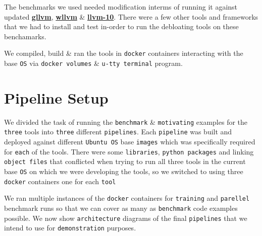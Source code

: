 \documentclass{relatorio}
\begin{document}
The benchmarks we used needed modification interms of running it against updated \textbf{\href{https://github.com/SRI-CSL/gllvm}{gllvm}}, \textbf{\href{https://github.com/SRI-CSL/whole-program-llvm}{wllvm}} \& \textbf{\href{https://github.com/lahiri-phdworks/llvm-project/tree/release/10.x}{llvm-10}}. There were a few other tools and frameworks that we had to install and test in-order to run the debloating tools on these benchamarks. 

We compiled, build \& ran the tools in \texttt{docker} containers interacting with the base \texttt{OS} via \texttt{docker volumes} \& \texttt{u-tty terminal} program.

\section{Pipeline Setup}%
\label{Tools}

We divided the task of running the \texttt{benchmark} \& \texttt{motivating} examples for the \texttt{three} tools into \texttt{three} different \texttt{pipelines}. Each \texttt{pipeline} was built and deployed against different \texttt{Ubuntu OS} base \texttt{images} which was specifically required for \texttt{each} of the tools. There were some \texttt{libraries}, \texttt{python packages} and linking \texttt{object files} that conflicted when trying to run all three tools in the current base \texttt{OS} on which we were developing the tools, so we switched to using three \texttt{docker} containers one for each \texttt{tool} 

We ran multiple instances of the \texttt{docker} containers for \texttt{training} and \texttt{parellel} benchmark runs so that we can cover as many as \texttt{benchmark} code examples possible. We now show \texttt{architecture} diagrams of the final \texttt{pipelines} that we intend to use for \texttt{demonstration} purposes. 
\end{document}
